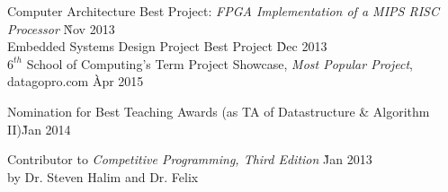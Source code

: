 \documentclass[9pt]{article}
\begin{document}
\begin{tabbing}
\hspace{12pt} \textbullet \hspace{3pt} Computer Architecture Best Project: \textit{FPGA Implementation of a MIPS RISC Processor} \` Nov 2013 \\
\hspace{12pt} \textbullet \hspace{3pt} Embedded Systems Design Project Best Project \` Dec 2013 \\
\hspace{12pt} \textbullet \hspace{3pt} \textit{$6^{th}$} School of Computing's Term Project Showcase, \textit{Most Popular Project}, datagopro.com \` Apr 2015 \\
\end{tabbing}\vspace{-18pt}

\begin{tabbing}
\hspace{12pt} \textbullet \hspace{3pt} Nomination for Best Teaching Awards (as TA of Datastructure \& Algorithm II)\` Jan 2014 \\
\end{tabbing}\vspace{-18pt}

\begin{tabbing}
\hspace{12pt} \textbullet \hspace{3pt} Contributor to \textit{Competitive Programming, Third Edition} \` Jan 2013 \\
\hspace{12pt} \hspace{12pt}by Dr. Steven Halim and Dr. Felix\\
\end{tabbing}
\end{document}
